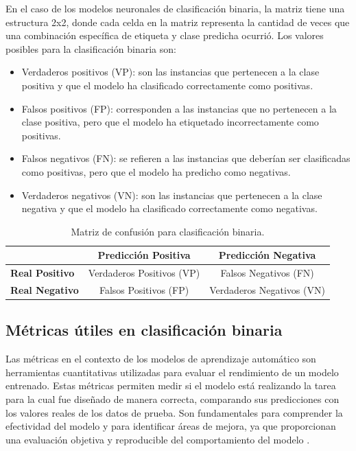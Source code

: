 En el caso de los modelos neuronales de clasificación binaria, la matriz tiene una estructura 2x2, donde cada celda en la matriz representa la cantidad de veces que una combinación específica de etiqueta y clase predicha ocurrió. Los valores posibles para la clasificación binaria son: 

\begin{itemize}

	\item Verdaderos positivos (VP): son las instancias que pertenecen a la clase positiva y que el modelo ha clasificado correctamente como positivas.

    \item Falsos positivos (FP): corresponden a las instancias que no pertenecen a la clase positiva, pero que el modelo ha etiquetado incorrectamente como positivas.

    \item Falsos negativos (FN): se refieren a las instancias que deberían ser clasificadas como positivas, pero que el modelo ha predicho como negativas.

    \item Verdaderos negativos (VN): son las instancias que pertenecen a la clase negativa y que el modelo ha clasificado correctamente como negativas.

\end{itemize}



\begin{table}[h]
\centering
\label{tab:confusion_matrix}
\begin{tabular}{|l|c|c|}
\hline
 & \textbf{Predicción Positiva} & \textbf{Predicción Negativa} \\ \hline
\textbf{Real Positivo} & Verdaderos Positivos (VP) & Falsos Negativos (FN) \\ \hline
\textbf{Real Negativo} & Falsos Positivos (FP) & Verdaderos Negativos (VN) \\ \hline
\end{tabular}
\caption{Matriz de confusión para clasificación binaria.}
\end{table}

\subsection{Métricas útiles en clasificación binaria}  \label{sec.metricas-bin}
Las métricas en el contexto de los modelos de aprendizaje automático son herramientas cuantitativas utilizadas para evaluar el rendimiento de un modelo entrenado. Estas métricas permiten medir si el modelo está realizando la tarea para la cual fue diseñado de manera correcta, comparando sus predicciones con los valores reales de los datos de prueba. Son fundamentales para comprender la efectividad del modelo y para identificar áreas de mejora, ya que proporcionan una evaluación objetiva y reproducible del comportamiento del modelo \cite{hastie2009elements}.

